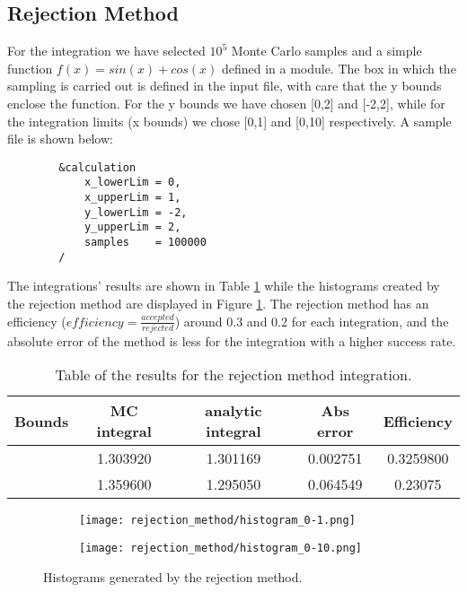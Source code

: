 \subsection{Rejection Method}
\label{subection:rejections_method}

For the integration we have selected $10^5$ Monte Carlo samples and a simple function $f(x) = sin(x) + cos(x)$ defined in a  module. The box in which the sampling is carried out is defined in the input file, with care that the y bounds enclose the function. For the y bounds we have chosen [0,2] and [-2,2], while for the integration limits (x bounds) we chose [0,1] and [0,10] respectively. A sample  file is shown below:

    \begin{tcolorbox}[
        boxrule=0pt,
        sharp corners
    ]
        \begin{lstlisting}
        &calculation
            x_lowerLim = 0,
            x_upperLim = 1,
            y_lowerLim = -2,
            y_upperLim = 2,
            samples    = 100000
        /
        \end{lstlisting}
    \end{tcolorbox}

    The integrations' results are shown in Table \ref{tab:rejection_method} while the histograms created by the rejection method are displayed in Figure \ref{fig:rejections_method}. The rejection method has an efficiency ($efficiency = \frac{accepted}{rejected}$) around 0.3 and 0.2 for each integration, and the absolute error of the method is less for the integration with a higher success rate.

    \begin{table}[!h]
        \centering
        \begin{tabular}{|c|c|c|c|c|}\hline
        Bounds  &   MC integral     &   analytic integral   &   Abs error   &   Efficiency  \\\hline
        [0,1]   &   1.303920        &   1.301169            &   0.002751    &   0.3259800   \\\hline
        [0,10]  &   1.359600        &   1.295050            &   0.064549    &   0.23075     \\\hline
        \end{tabular}
        \caption{Table of the results for the rejection method integration.}
        \label{tab:rejection_method}
    \end{table}


    \begin{figure}[H]
        \centering
        \begin{subfigure}{0.48\textwidth}
            \texttt{[image: rejection\_method/histogram\_0-1.png]}
            \caption{}
        \end{subfigure}
        \begin{subfigure}{0.48\textwidth}
            \texttt{[image: rejection\_method/histogram\_0-10.png]}
            \caption{}
        \end{subfigure}
        \caption{Histograms generated by the rejection method.}
        \label{fig:rejections_method}
    \end{figure}

